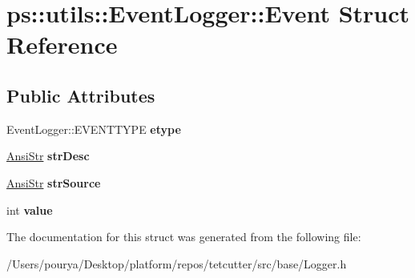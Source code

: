 \hypertarget{structps_1_1utils_1_1EventLogger_1_1Event}{}\section{ps\+:\+:utils\+:\+:Event\+Logger\+:\+:Event Struct Reference}
\label{structps_1_1utils_1_1EventLogger_1_1Event}
\subsection*{Public Attributes}
\begin{DoxyCompactItemize}
\item 
\hypertarget{structps_1_1utils_1_1EventLogger_1_1Event_abd567d95cdef3c2d7d1582e32604beff}{}Event\+Logger\+::\+E\+V\+E\+N\+T\+T\+Y\+P\+E {\bfseries etype}\label{structps_1_1utils_1_1EventLogger_1_1Event_abd567d95cdef3c2d7d1582e32604beff}

\item 
\hypertarget{structps_1_1utils_1_1EventLogger_1_1Event_a2492f5382f17bceb58d0a3f0526bd856}{}\hyperlink{classps_1_1base_1_1CAString}{Ansi\+Str} {\bfseries str\+Desc}\label{structps_1_1utils_1_1EventLogger_1_1Event_a2492f5382f17bceb58d0a3f0526bd856}

\item 
\hypertarget{structps_1_1utils_1_1EventLogger_1_1Event_aff09bc1a51cf30196c5de540eaa138b2}{}\hyperlink{classps_1_1base_1_1CAString}{Ansi\+Str} {\bfseries str\+Source}\label{structps_1_1utils_1_1EventLogger_1_1Event_aff09bc1a51cf30196c5de540eaa138b2}

\item 
\hypertarget{structps_1_1utils_1_1EventLogger_1_1Event_a99b03414776fc8b1ce2608279b900222}{}int {\bfseries value}\label{structps_1_1utils_1_1EventLogger_1_1Event_a99b03414776fc8b1ce2608279b900222}

\end{DoxyCompactItemize}


The documentation for this struct was generated from the following file\+:\begin{DoxyCompactItemize}
\item 
/\+Users/pourya/\+Desktop/platform/repos/tetcutter/src/base/Logger.\+h\end{DoxyCompactItemize}
